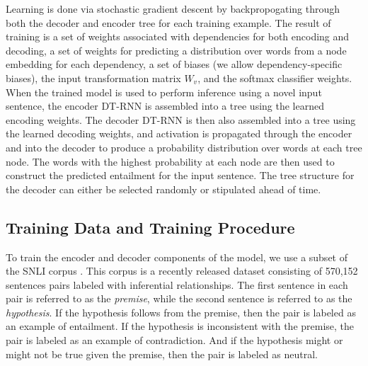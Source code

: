 \documentclass[utf8]{frontiersSCNS} %
\begin{document}
Learning is done via stochastic gradient descent by backpropogating through both the decoder and encoder tree for each training example. The result of training is a set of weights associated with dependencies for both encoding and decoding, a set of weights for predicting a distribution over words from a node embedding for each dependency, a set of biases (we allow dependency-specific biases), the input transformation matrix $W_v$, and the softmax classifier weights. When the trained model is used to perform inference using a novel input sentence, the encoder DT-RNN is assembled into a tree using the learned encoding weights. The decoder DT-RNN is then also assembled into a tree using the learned decoding weights, and activation is propagated through the encoder and into the decoder to produce a probability distribution over words at each tree node. The words with the highest probability at each node are then used to construct the predicted entailment for the input sentence. The tree structure for the decoder can either be selected randomly or stipulated ahead of time.

\subsection{Training Data and Training Procedure}

To train the encoder and decoder components of the model, we use a subset of the SNLI corpus \citep{Bowman:2015}. This corpus is a recently released dataset consisting of 570,152 sentences pairs labeled with inferential relationships. The first sentence in each pair is referred to as the \textit{premise}, while the second sentence is referred to as the \textit{hypothesis}. If the hypothesis follows from the premise, then the pair is labeled as an example of entailment. If the hypothesis is inconsistent with the premise, the pair is labeled as an example of contradiction. And if the hypothesis might or might not be true given the premise, then the pair is labeled as neutral.
\end{document}
